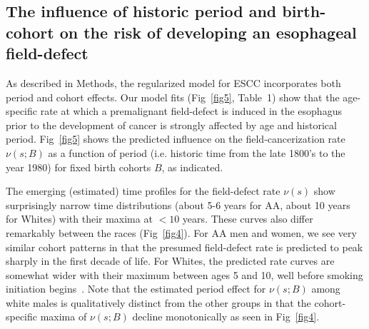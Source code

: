 \documentclass[10pt,letterpaper]{article}
\begin{document}
\subsection*{The influence of historic period and birth-cohort on the risk of developing an esophageal field-defect}
As described in Methods, the regularized model for ESCC incorporates both period and cohort effects. Our model fits (Fig~\ref{fig5}, Table~1) show that the age-specific rate at which a premalignant field-defect is induced in the esophagus prior to the development of cancer is strongly affected by age and historical period. Fig~\ref{fig5} shows the predicted influence on the field-cancerization rate $\nu(s; B)$ as a function of period (i.e. historic time from the late 1800's to the year 1980) for fixed birth cohorts $B$, as indicated.  

The emerging (estimated) time profiles for the field-defect rate $\nu(s)$ show surprisingly narrow time distributions (about 5-6 years for AA, about 10 years for Whites) with their maxima at $<10$ years. These curves also differ remarkably between the races (Fig~\ref{fig4}). For AA men and women, we see very similar cohort patterns in that the presumed field-defect rate is predicted to peak sharply in the first decade of life. For Whites, the predicted rate curves are somewhat wider with their maximum between ages 5 and 10, well before smoking initiation begins~\cite{Holford2016}.  Note that the estimated period effect for $\nu(s; B)$ among white males is qualitatively distinct from the other groups in that the cohort-specific maxima of $\nu(s; B)$ decline monotonically as seen in Fig~\ref{fig4}.
\medskip
\end{document}
